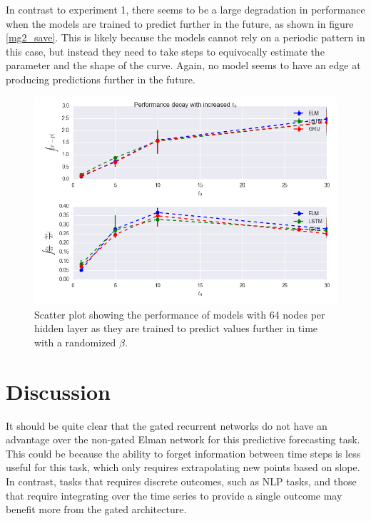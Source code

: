 \documentclass[11pt]{article}
\begin{document}
In contrast to experiment 1, there seems to be a large degradation in
performance when the models are trained to predict further in the
future, as shown in figure \ref{mg2_save}. This is likely because the models cannot rely on a periodic
pattern in this case, but instead they need to take steps to
equivocally estimate the parameter and the shape of the curve. Again,
no model seems to have an edge at producing predictions further in the future. 

  \begin{figure}
    \begin{center}
   \includegraphics[width=.96\textwidth]{figures/mg2_save.png}      
    \caption{Scatter plot showing the performance of models with 64 nodes
      per hidden layer as they are trained to predict values further
      in time with a randomized $\beta$.}
    \label{fig:mg2_save}
    \end{center}
  \end{figure}

\section {Discussion}
It should be quite clear that the gated recurrent networks do not have
an advantage over the non-gated Elman network for this predictive
forecasting task. This could be because the ability to forget
information between time steps is less useful for this task, which
only requires extrapolating new points based on slope. In contrast,
tasks that requires discrete outcomes, such as NLP tasks, and those
that require integrating over the time series to provide a single
outcome may benefit more from the gated architecture. 
\end{document}
